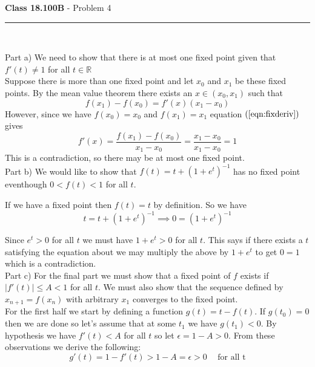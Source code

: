 \documentclass[11pt,reqno]{article}
\begin{document}
\vspace{15pt}
\begin{flushleft} 
\textbf{Class 18.100B} - Problem 4\\
\rule{500pt}{1pt}\\
\end{flushleft} 

\noindent Part a) We need to show that there is at most one fixed point given that $f'(t) \neq 1$ for all $t \in \mathbb{R}$\\
\indent  Suppose there is more than one fixed point and let $x_0$ and $x_1$ be these fixed points.  By the mean value theorem there exists an $x \in (x_0,x_1)$ such that 
\begin{equation}
 f(x_1) - f(x_0) = f'(x)(x_1-x_0) \label{eqn:fixderiv}
 \end{equation}
However, since we have $f(x_0) = x_0$ and $f(x_1) = x_1$ equation $(\ref{eqn:fixderiv})$ gives
\[ f'(x) = \frac{f(x_1)-f(x_0)}{x_1-x_0} = \frac{x_1-x_0}{x_1-x_0} = 1\]
This is a contradiction, so there may be at most one fixed point.\\

\noindent Part b) We would like to show that $f(t) = t + (1+e^t)^{-1}$ has no fixed point eventhough $0 < f(t) < 1$ for all $t$.

If we have a fixed point then $f(t) = t$ by definition. So we have
\begin{equation}
t = t + (1+e^t)^{-1} \implies 0 = (1+e^t)^{-1} 
\end{equation}

Since $e^t > 0$ for all $t$ we must have $1+e^t > 0$ for all $t$. This says if there exists a $t$ satisfying the equation about we may multiply the above by $1+e^t$ to get $0 = 1$ which is a contradiction.\\

\noindent Part c) For the final part we must show that a fixed point of $f$ exists if $|f'(t)| \le A < 1$ for all $t$. We must also show that the sequence defined by $x_{n+1} = f(x_n)$ with arbitrary $x_1$ converges to the fixed point.\\

For the first half we start by defining a function $g(t) = t - f(t)$. If $g(t_0) = 0$ then we are done so let's assume that at some $t_1$ we have $g(t_1) < 0 $. By hypothesis we have $f'(t) < A$ for all $t$ so let $\epsilon = 1 - A > 0$. From these observations we derive the following:
\begin{equation}
g'(t) = 1 - f'(t) > 1 - A = \epsilon > 0 \hspace{15pt} \text{for all t}
\end{equation}
\end{document}
